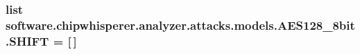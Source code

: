 \subsubsection[{S\+H\+I\+F\+T}]{\setlength{\rightskip}{0pt plus 5cm}list software.\+chipwhisperer.\+analyzer.\+attacks.\+models.\+A\+E\+S128\+\_\+8bit.\+S\+H\+I\+F\+T = \mbox{[}$\,$\mbox{]}}\label{namespacesoftware_1_1chipwhisperer_1_1analyzer_1_1attacks_1_1models_1_1AES128__8bit_aaf8f4a7882a964a28ab807fa9e4ccc73}
